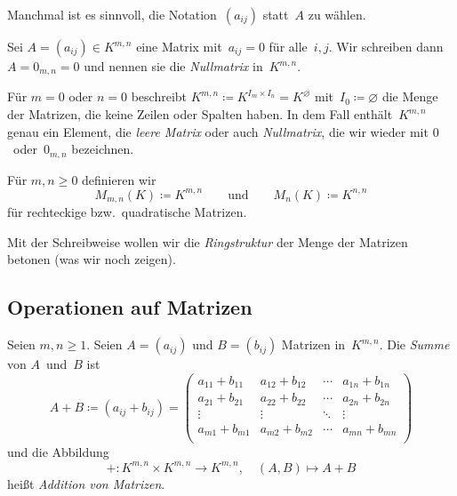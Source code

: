 \documentclass[a4paper]{article}
\begin{document}
Manchmal ist es sinnvoll, die Notation~$(a_{ij})$ statt~$A$ zu wählen.

\begin{definition}[Nullmatrix]
    Sei $A = (a_{ij}) \in K^{m,n}$ eine Matrix mit~$a_{ij} = 0$ für alle~$i,j$. Wir schreiben dann $A = 0_{m,n} = 0$ und nennen sie die \emph{Nullmatrix} in~$K^{m,n}$.

    Für $m = 0$ oder $n = 0$ beschreibt $K^{m,n} \coloneqq K^{I_m\times I_n} = K^\varnothing$ mit~$I_0 \coloneqq \varnothing$ die Menge der Matrizen, die keine Zeilen oder Spalten haben. In dem Fall enthält~$K^{m,n}$ genau ein Element, die \emph{leere Matrix} oder auch \emph{Nullmatrix}, die wir wieder mit $0$~oder~$0_{m,n}$ bezeichnen.
\end{definition}

\begin{notation}
    Für $m,n \geq 0$ definieren wir
    \begin{equation*}
        M_{m,n}(K) \coloneqq K^{m,n} \qquad\text{und}\qquad M_n(K) \coloneqq K^{n,n}
    \end{equation*}
    für rechteckige bzw.\ quadratische Matrizen.
\end{notation}

Mit der Schreibweise wollen wir die \emph{Ringstruktur} der Menge der Matrizen betonen (was wir noch zeigen).


\subsection{Operationen auf Matrizen}

\begin{definition}[Addition]
    Seien $m,n \geq 1$. Seien $A = (a_{ij})$ und $B = (b_{ij})$ Matrizen in~$K^{m,n}$. Die \emph{Summe} von $A$~und~$B$ ist
    \begin{equation*}
        A+B \coloneqq (a_{ij}+b_{ij}) =
        \begin{pmatrix}
            a_{11}+b_{11} & a_{12}+b_{12} & \cdots & a_{1n}+b_{1n} \\
            a_{21}+b_{21} & a_{22}+b_{22} & \cdots & a_{2n}+b_{2n} \\
            \vdots        & \vdots        & \ddots & \vdots        \\
            a_{m1}+b_{m1} & a_{m2}+b_{m2} & \cdots & a_{mn}+b_{mn} \\
        \end{pmatrix}
    \end{equation*}
    und die Abbildung
    \begin{equation*}
        +\colon K^{m,n} \times K^{m,n} \to K^{m,n},\quad (A,B) \mapsto A+B
    \end{equation*}
    heißt \emph{Addition von Matrizen}.
\end{definition}
\end{document}

